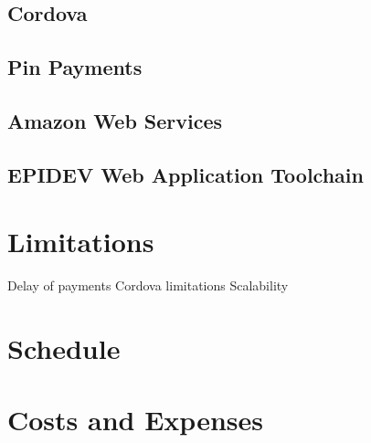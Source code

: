 \documentclass[a4paper, 11pt, oneside]{Thesis}  %
\begin{document}
\section{Cordova}
\section{Pin Payments}
\section{Amazon Web Services}
\section{EPIDEV Web Application Toolchain}
\chapter{Limitations}
\label{Limitations}

Delay of payments
Cordova limitations
Scalability

\chapter{Schedule}
\label{Schedule}
\chapter{Costs and Expenses }
\label{Costs and Expenses }
\end{document}
